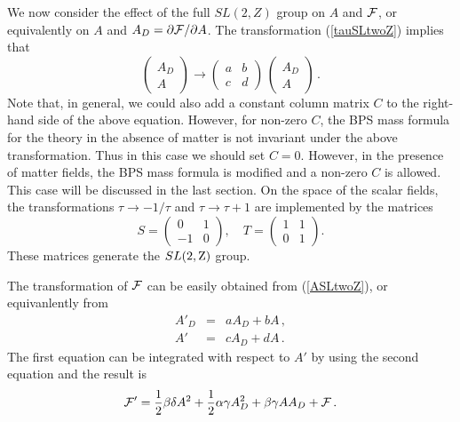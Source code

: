 We now consider the effect of the full $SL(2,Z)$ group on $A$ and
${\cal F}$, or equivalently on $A$ and $A_D=\partial{\cal F}/\partial
A$. The transformation (\ref{tauSLtwoZ}) implies that
\begin{equation}
\left(\begin{array}{c}A_D\\ A\end{array}\right)\rightarrow
\left(\begin{array}{cc} a & b \\ c & d \end{array}\right)
\,\left(\begin{array}{c}A_D\\ A \end{array}\right) \,.
\label{ASLtwoZ}
\end{equation} 
Note that, in general, we could also add a constant column matrix $C$
to the right-hand side of the above equation. However, for non-zero
$C$, the BPS mass formula for the theory in the absence of matter is
not invariant under the above transformation. Thus in this case we
should set $C=0$. However, in the presence of matter fields, the BPS
mass formula is modified and a non-zero $C$ is allowed. This case will
be discussed in the last section. On the space of the scalar fields,
the transformations $\tau\rightarrow -1/\tau$ and $\tau\rightarrow
\tau+1$ are implemented by the matrices
\begin{equation}  
S=\left(\begin{array}{cc}0&1\\-1&0\end{array}\right),\quad
T=\left(\begin{array}{cc}1&1\\0&1\end{array}\right).
\label{ST}
\end{equation}
These matrices generate the $SL(2,{\rm Z})$ group.

The transformation of ${\cal F}$ can be easily obtained from
(\ref{ASLtwoZ}), or equivanlently from 
\begin{eqnarray}
A'_D &=& a A_D + b A\,, \nonumber\\
A'   &=& c A_D + d A\,. \nonumber
\end{eqnarray}
The first equation can be integrated with respect to $A'$ by using the
second equation and the result is 
$$
{\cal F}'=\frac{1}{2}\beta\delta A^2 +\frac{1}{2}\alpha\gamma A^2_D
+\beta\gamma A A_D + {\cal F}\,.
$$

